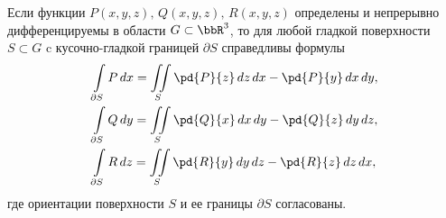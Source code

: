 \begin{thm}
Если функции $P(x,y,z),\, Q(x,y,z),\, R(x,y,z)$ определены и непрерывно дифференцируемы в области $G\subset \bbR^3$, то для любой гладкой поверхности $S\subset G$ c кусочно-гладкой границей $\partial S$ справедливы формулы
\begin{align}\label{yaa14e2}
&\int\limits_{\partial S} P\,dx = \iint\limits_{S} \pd{P}{z}\,dz\,dx-\pd{P}{y}\,dx\,dy,
\\\label{yaa14e3}
&\int\limits_{\partial S} Q\,dy = \iint\limits_{S} \pd{Q}{x}\,dx\,dy- \pd{Q}{z}\,dy\,dz,
\\ \label{yaa14e4}
&\int\limits_{\partial S} R\,dz =\iint\limits_{S} \pd{R}{y}\,dy\,dz- \pd{R}{z}\,dz\,dx,
\end{align}
где ориентации поверхности $S$ и ее границы $\partial S$ согласованы.
\end{thm}
